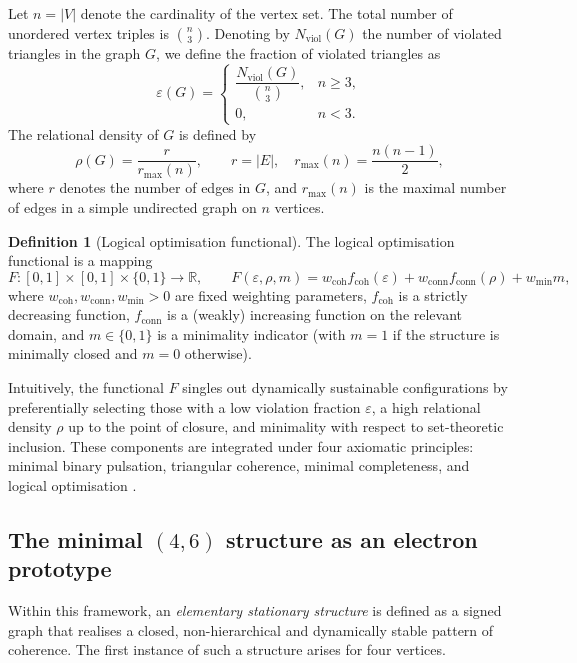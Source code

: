 \documentclass[11pt,a4paper]{article}
\theoremstyle{plain}
\theoremstyle{definition}
\newtheorem{definition}{Definition}
\theoremstyle{remark}
\begin{document}
Let \(n = |V|\) denote the cardinality of the vertex set. The total number of unordered vertex triples is \(\binom{n}{3}\). Denoting by \(N_{\mathrm{viol}}(G)\) the number of violated triangles in the graph \(G\), we define the fraction of violated triangles as
\[
  \varepsilon(G)
  = \begin{cases}
      \dfrac{N_{\mathrm{viol}}(G)}{\binom{n}{3}}, & n \ge 3, \\[0.5em]
      0, & n < 3.
    \end{cases}
\]
The relational density of \(G\) is defined by
\[
  \rho(G) = \frac{r}{r_{\max}(n)},
  \qquad
  r = |E|,
  \quad
  r_{\max}(n) = \frac{n(n-1)}{2},
\]
where \(r\) denotes the number of edges in \(G\), and \(r_{\max}(n)\) is the maximal number of edges in a simple undirected graph on \(n\) vertices.

\begin{definition}[Logical optimisation functional]
  The logical optimisation functional is a mapping
  \[
    F : [0,1] \times [0,1] \times \{0,1\} \to \mathbb{R},
    \qquad
    F(\varepsilon,\rho,m) = w_{\mathrm{coh}} f_{\mathrm{coh}}(\varepsilon)
    + w_{\mathrm{conn}} f_{\mathrm{conn}}(\rho)
    + w_{\mathrm{min}} m,
  \]
  where \(w_{\mathrm{coh}},w_{\mathrm{conn}},w_{\mathrm{min}} > 0\) are fixed weighting parameters,
  \(f_{\mathrm{coh}}\) is a strictly decreasing function, \(f_{\mathrm{conn}}\) is a (weakly) increasing
  function on the relevant domain, and \(m \in \{0,1\}\) is a minimality indicator
  (with \(m = 1\) if the structure is minimally closed and \(m = 0\) otherwise).
\end{definition}

Intuitively, the functional \(F\) singles out dynamically sustainable configurations by preferentially selecting those with a low violation fraction \(\varepsilon\), a high relational density \(\rho\) up to the point of closure, and minimality with respect to set-theoretic inclusion. These components are integrated under four axiomatic principles: minimal binary pulsation, triangular coherence, minimal completeness, and logical optimisation \cite{Laubscher2026IntroPDL,Laubscher2026PDL_English}.

\subsection{The minimal \texorpdfstring{\((4,6)\)}{(4,6)} structure as an electron prototype}

Within this framework, an \emph{elementary stationary structure} is defined as a signed graph that realises a closed, non-hierarchical and dynamically stable pattern of coherence. The first instance of such a structure arises for four vertices.
\end{document}
